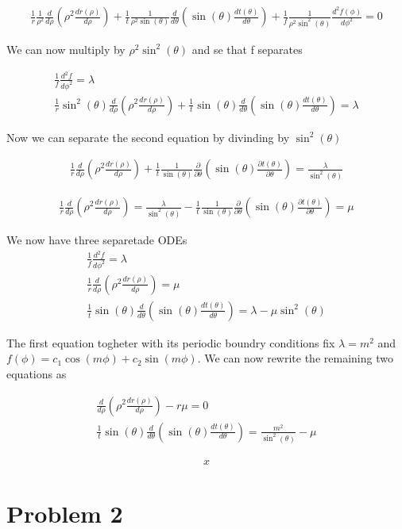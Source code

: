 \documentclass[a4paper]{article}
\begin{document}
\begin{align*}
    \frac{1}{r}\frac{1}{\rho^2} \frac{d}{d \rho} \left( \rho^2 \frac{d r(\rho)}{d \rho} \right) + \frac{1}{t}\frac{1}{\rho^2\sin(\theta)} \frac{d}{d \theta} \left( \sin(\theta) \frac{d t(\theta)}{d \theta} \right) + \frac{1}{f}\frac{1}{\rho^2 \sin^2(\theta)} \frac{d^2 f(\phi)}{d \phi^2} = 0
\end{align*}

We can now multiply by $\rho^2 \sin^2(\theta)$ and se that f separates

\begin{align*}
    \frac{1}{f}\frac{d^2f}{d\phi^2} = \lambda \\
    \frac{1}{r} \sin^2(\theta) \frac{d}{d \rho} \left( \rho^2 \frac{d r(\rho)}{d \rho} \right) + \frac{1}{t} \sin(\theta) \frac{d}{d \theta} \left( \sin(\theta) \frac{d t(\theta)}{d \theta} \right) = \lambda
\end{align*}

Now we can separate the second equation by divinding by $\sin^2(\theta)$

\begin{align*}
    \frac{1}{r}\frac{d}{d\rho}\left(\rho^2 \frac{dr(\rho)}{d\rho}\right) + \frac{1}{t} \frac{1}{\sin(\theta)} \frac{\partial}{\partial \theta} \left( \sin(\theta) \frac{\partial t(\theta)}{\partial \theta} \right) = \frac{\lambda}{\sin^2(\theta)}
\end{align*}

\begin{align*}
    \frac{1}{r}\frac{d}{d\rho}\left(\rho^2 \frac{dr(\rho)}{d\rho}\right) = \frac{\lambda}{\sin^2(\theta)} - \frac{1}{t} \frac{1}{\sin(\theta)} \frac{\partial}{\partial \theta} \left( \sin(\theta) \frac{\partial t(\theta)}{\partial \theta} \right) = \mu
\end{align*}

We now have three separetade ODEs
\begin{align*}
    \frac{1}{f}\frac{d^2f}{d\phi^2} = \lambda \\
    \frac{1}{r}\frac{d}{d\rho}\left(\rho^2 \frac{dr(\rho)}{d\rho}\right) = \mu \\
    \frac{1}{t} \sin(\theta) \frac{d}{d \theta} \left( \sin(\theta) \frac{d t(\theta)}{d \theta} \right) = \lambda - \mu \sin^2(\theta)
\end{align*}

The first equation togheter with its periodic boundry conditions fix $\lambda = m^2$ and $f(\phi) = c_1\cos(m\phi) + c_2\sin(m\phi)$. We can now rewrite the remaining two equations as

\begin{align*}
    \frac{d}{d\rho}\left(\rho^2 \frac{dr(\rho)}{d\rho}\right) -r\mu = 0 \\
    \frac{1}{t} \sin(\theta) \frac{d}{d \theta} \left( \sin(\theta) \frac{d t(\theta)}{d \theta} \right) = \frac{m^2}{\sin^2(\theta)} - \mu
\end{align*}

\begin{align*}
    x
\end{align*}
\section*{Problem 2}
\end{document}
